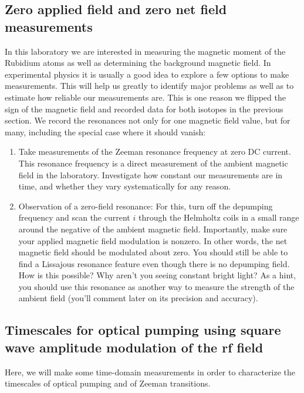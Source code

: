 \documentclass{../lab}
\begin{document}
\subsection{Zero applied field and zero net field measurements}

In this laboratory we are interested in measuring the magnetic moment of the Rubidium atoms as well as determining the background magnetic field. In experimental physics it is usually a good idea to explore a few options to make measurements. This will help us greatly to identify major problems as well as to estimate how reliable our measurements are. This is one reason we flipped the sign of the magnetic field and recorded data for both isotopes in the previous section. We record the resonances not only for one magnetic field value, but for many, including the special case where it should vanish:

\begin{enumerate}
    \item Take measurements of the Zeeman resonance frequency at zero DC current.  This resonance frequency is a direct measurement of the ambient magnetic field in the laboratory. Investigate how constant our measurements are in time, and whether they vary systematically for any reason.
    \item Observation of a zero-field resonance: For this, turn off the depumping frequency and scan the current $i$ through the Helmholtz coils in a small range around the negative of the ambient magnetic field. Importantly, make sure your applied magnetic field modulation is nonzero. In other words, the net magnetic field should be modulated about zero. You should still be able to find a Lissajous resonance feature even though there is no depumping field. How is this possible? Why aren't you seeing constant bright light? As a hint, you should use this resonance as another way to measure the strength of the ambient field (you'll comment later on its precision and accuracy).
\end{enumerate}


\subsection{Timescales for optical pumping using square wave amplitude modulation of the rf field}
\label{sec:timescales-procedure}

Here, we will make some time-domain measurements in order to characterize the timescales of optical pumping and of Zeeman transitions.
\end{document}
